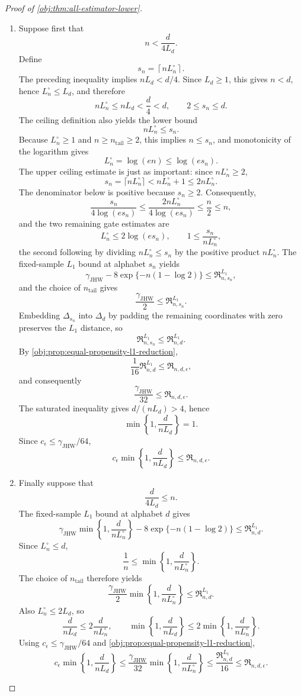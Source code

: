 \documentclass[11pt]{article}
\begin{document}
\begin{proof}[Proof of \cref{obj:thm:all-estimator-lower}]
\begin{enumerate}
\item
Suppose first that
\[
n<\frac{d}{4L_d}.
\]
Define
\[
s_n=\left\lceil nL_n^\circ\right\rceil .
\]
The preceding inequality implies \(nL_d<d/4\).  Since \(L_d\ge1\), this gives
\(n<d\), hence \(L_n^\circ\le L_d\), and therefore
\[
nL_n^\circ\le nL_d<\frac d4<d,
\qquad
2\le s_n\le d.
\]
The ceiling definition also yields the lower bound
\[
nL_n^\circ\le s_n.
\]
Because \(L_n^\circ\ge1\) and \(n\ge n_{\mathrm{tail}}\ge2\), this implies
\(n\le s_n\), and monotonicity of the logarithm gives
\[
L_n^\circ=\log(en)\le \log(es_n).
\]
The upper ceiling estimate is just as important: since \(nL_n^\circ\ge2\),
\[
s_n=\lceil nL_n^\circ\rceil
< nL_n^\circ+1
\le 2nL_n^\circ .
\]
The denominator below is positive because \(s_n\ge2\).  Consequently,
\[
\frac{s_n}{4\log(es_n)}
\le
\frac{2nL_n^\circ}{4\log(es_n)}
\le
\frac n2
\le n,
\]
and the two remaining gate estimates are
\[
L_n^\circ\le2\log(es_n),
\qquad
1\le\frac{s_n}{nL_n^\circ},
\]
the second following by dividing \(nL_n^\circ\le s_n\) by the positive product
\(nL_n^\circ\).
The fixed-sample \(L_1\) bound at alphabet \(s_n\) yields
\[
\gamma_{\mathrm{JHW}}
-
8\exp\{-n(1-\log2)\}
\le
\mathfrak R^{L_1}_{n,s_n},
\]
and the choice of \(n_{\mathrm{tail}}\) gives
\[
\frac{\gamma_{\mathrm{JHW}}}{2}
\le
\mathfrak R^{L_1}_{n,s_n}.
\]
Embedding \(\Delta_{s_n}\) into \(\Delta_d\) by padding the remaining
coordinates with zero preserves the \(L_1\) distance, so
\[
\mathfrak R^{L_1}_{n,s_n}\le \mathfrak R^{L_1}_{n,d}.
\]
By \cref{obj:prop:equal-propensity-l1-reduction},
\[
\frac{1}{16}\mathfrak R^{L_1}_{n,d}
\le
\mathfrak R_{n,d,\epsilon},
\]
and consequently
\[
\frac{\gamma_{\mathrm{JHW}}}{32}
\le
\mathfrak R_{n,d,\epsilon}.
\]
The saturated inequality gives \(d/(nL_d)>4\), hence
\[
\min\left\{1,\frac{d}{nL_d}\right\}=1.
\]
Since \(c_\epsilon\le\gamma_{\mathrm{JHW}}/64\),
\[
c_\epsilon\min\left\{1,\frac{d}{nL_d}\right\}
\le
\mathfrak R_{n,d,\epsilon}.
\]

\item
Finally suppose that
\[
\frac{d}{4L_d}\le n.
\]
The fixed-sample \(L_1\) bound at alphabet \(d\) gives
\[
\gamma_{\mathrm{JHW}}
\min\left\{1,\frac{d}{nL_n^\circ}\right\}
-
8\exp\{-n(1-\log2)\}
\le
\mathfrak R^{L_1}_{n,d}.
\]
Since \(L_n^\circ\le d\),
\[
\frac1n
\le
\min\left\{1,\frac{d}{nL_n^\circ}\right\}.
\]
The choice of \(n_{\mathrm{tail}}\) therefore yields
\[
\frac{\gamma_{\mathrm{JHW}}}{2}
\min\left\{1,\frac{d}{nL_n^\circ}\right\}
\le
\mathfrak R^{L_1}_{n,d}.
\]
Also \(L_n^\circ\le2L_d\), so
\[
\frac{d}{nL_d}
\le
2\frac{d}{nL_n^\circ},
\qquad
\min\left\{1,\frac{d}{nL_d}\right\}
\le
2\min\left\{1,\frac{d}{nL_n^\circ}\right\}.
\]
Using \(c_\epsilon\le\gamma_{\mathrm{JHW}}/64\) and
\cref{obj:prop:equal-propensity-l1-reduction},
\[
c_\epsilon\min\left\{1,\frac{d}{nL_d}\right\}
\le
\frac{\gamma_{\mathrm{JHW}}}{32}
\min\left\{1,\frac{d}{nL_n^\circ}\right\}
\le
\frac{\mathfrak R^{L_1}_{n,d}}{16}
\le
\mathfrak R_{n,d,\epsilon}.
\]
\end{enumerate}


\end{proof}
\end{document}
